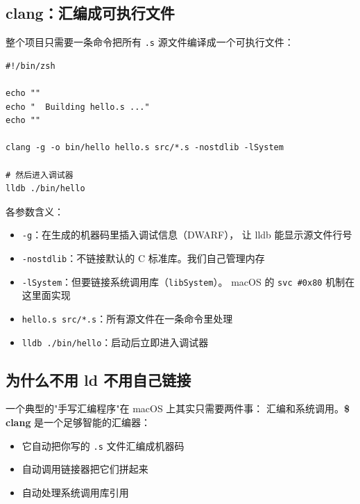 \subsection{clang：汇编成可执行文件}

整个项目只需要一条命令把所有 \texttt{.s} 源文件编译成一个可执行文件：

\begin{lstlisting}[style=bashstyle,caption=ISA/run.sh — 一键构建]
#!/bin/zsh

echo ""
echo "  Building hello.s ..."
echo ""

clang -g -o bin/hello hello.s src/*.s -nostdlib -lSystem

# 然后进入调试器
lldb ./bin/hello
\end{lstlisting}

各参数含义：

\begin{itemize}
    \item \texttt{-g}：在生成的机器码里插入调试信息（DWARF），
        让 lldb 能显示源文件行号
    \item \texttt{-nostdlib}：不链接默认的 C 标准库。我们自己管理内存
    \item \texttt{-lSystem}：但要链接系统调用库（\texttt{libSystem}）。
        macOS 的 \texttt{svc \#0x80} 机制在这里面实现
    \item \texttt{hello.s src/*.s}：所有源文件在一条命令里处理
    \item \texttt{lldb ./bin/hello}：启动后立即进入调试器
\end{itemize}

\subsection{为什么不用 ld 不用自己链接}

一个典型的"手写汇编程序"在 macOS 上其实只需要两件事：
汇编和系统调用。\textbf{\$ clang} 是一个足够智能的汇编器：

\begin{itemize}
    \item 它自动把你写的 \texttt{.s} 文件汇编成机器码
    \item 自动调用链接器把它们拼起来
    \item 自动处理系统调用库引用
\end{itemize}


